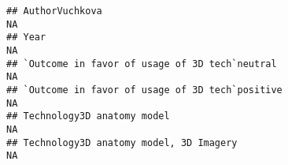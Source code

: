 \documentclass[]{article}
\begin{document}
\begin{verbatim}
## AuthorVuchkova                                                                                                                                                                                                                                                                                                                                                                                                                                                                          NA
## Year                                                                                                                                                                                                                                                                                                                                                                                                                                                                                    NA
## `Outcome in favor of usage of 3D tech`neutral                                                                                                                                                                                                                                                                                                                                                                                                                                           NA
## `Outcome in favor of usage of 3D tech`positive                                                                                                                                                                                                                                                                                                                                                                                                                                          NA
## Technology3D anatomy model                                                                                                                                                                                                                                                                                                                                                                                                                                                              NA
## Technology3D anatomy model, 3D Imagery                                                                                                                                                                                                                                                                                                                                                                                                                                                  NA

\end{verbatim}
\end{document}
